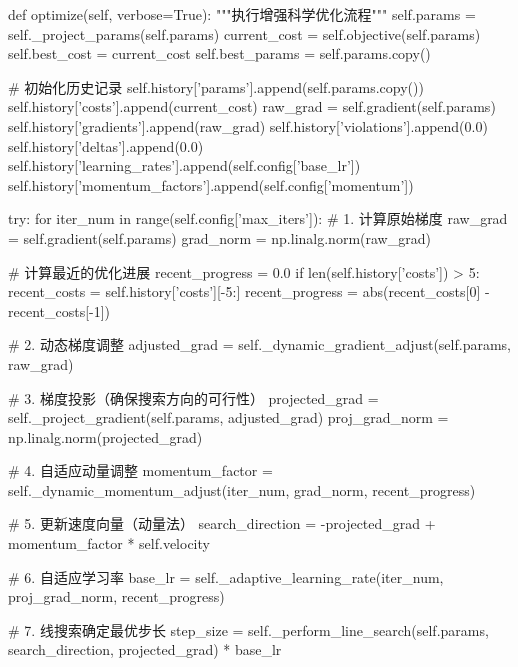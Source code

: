 \documentclass[a4paper,12pt]{article}
\begin{document}
\begin{python}
    def optimize(self, verbose=True):
        """执行增强科学优化流程"""
        self.params = self._project_params(self.params)
        current_cost = self.objective(self.params)
        self.best_cost = current_cost
        self.best_params = self.params.copy()
        
        # 初始化历史记录
        self.history['params'].append(self.params.copy())
        self.history['costs'].append(current_cost)
        raw_grad = self.gradient(self.params)
        self.history['gradients'].append(raw_grad)
        self.history['violations'].append(0.0)
        self.history['deltas'].append(0.0)
        self.history['learning_rates'].append(self.config['base_lr'])
        self.history['momentum_factors'].append(self.config['momentum'])
        
        try:
            for iter_num in range(self.config['max_iters']):
                # 1. 计算原始梯度
                raw_grad = self.gradient(self.params)
                grad_norm = np.linalg.norm(raw_grad)
                
                # 计算最近的优化进展
                recent_progress = 0.0
                if len(self.history['costs']) > 5:
                    recent_costs = self.history['costs'][-5:]
                    recent_progress = abs(recent_costs[0] - recent_costs[-1])
                
                # 2. 动态梯度调整
                adjusted_grad = self._dynamic_gradient_adjust(self.params, raw_grad)
                
                # 3. 梯度投影（确保搜索方向的可行性）
                projected_grad = self._project_gradient(self.params, adjusted_grad)
                proj_grad_norm = np.linalg.norm(projected_grad)
                
                # 4. 自适应动量调整
                momentum_factor = self._dynamic_momentum_adjust(iter_num, grad_norm, recent_progress)
                
                # 5. 更新速度向量（动量法）
                search_direction = -projected_grad + momentum_factor * self.velocity
                
                # 6. 自适应学习率
                base_lr = self._adaptive_learning_rate(iter_num, proj_grad_norm, recent_progress)
                
                # 7. 线搜索确定最优步长
                step_size = self._perform_line_search(self.params, search_direction, projected_grad) * base_lr
                

\end{python}
\end{document}
